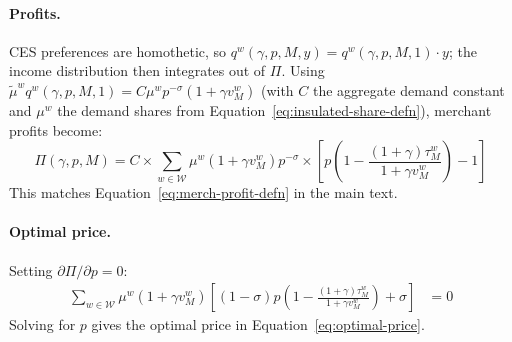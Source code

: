 \documentclass[main.tex]{subfiles}
\begin{document}
\paragraph{Profits.} CES preferences are homothetic, so $q^w(\gamma,p,M,y) = q^w(\gamma,p,M,1)\cdot y$; the income distribution then integrates out of $\Pi$.
Using $\tilde{\mu}^w q^w(\gamma,p,M,1)=C\mu^{w}p^{-\sigma}\left(1+\gamma v_{M}^{w}\right)$
(with $C$ the aggregate demand constant and $\mu^w$ the demand shares from Equation~\ref{eq:insulated-share-defn}), merchant profits become:
\begin{equation}
\Pi\left(\gamma,p,M\right) = C \times \sum_{w\in\mathcal{W}}\mu^{w}\left(1+\gamma v_{M}^{w}\right)p^{-\sigma}\times\left[p\left(1-\frac{(1+\gamma)\tau_{M}^{w}}{1+\gamma v_{M}^{w}}\right)-1\right]
\end{equation}
This matches Equation~\ref{eq:merch-profit-defn} in the main text.

\paragraph{Optimal price.} Setting $\partial\Pi/\partial p=0$:
\begin{align}
\sum_{w\in\mathcal{W}}\mu^{w}\left(1+\gamma v_{M}^{w}\right)\left[\left(1-\sigma\right)p\left(1-\frac{(1+\gamma)\tau_{M}^{w}}{1+\gamma v_{M}^{w}}\right)+\sigma\right] & =0
\end{align}
Solving for $p$ gives the optimal price in Equation~\ref{eq:optimal-price}.


\end{document}

